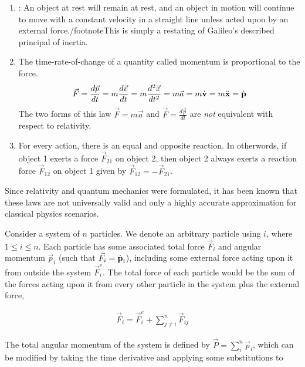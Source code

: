 \begin{fancybox}{1}
	\begin{enumerate}
		\item {}: An object at rest will remain at rest, and an object in motion will continue to move with a constant velocity in a straight line unless acted upon by an external force./footnote{This is simply a restating of Galileo's described principal of inertia.}
		\item The time-rate-of-change of a quantity called momentum is proportional to the force.
		\begin{align}
			\vec{F}=\frac{d\vec{p}}{dt} = m\frac{d\vec{v}}{dt} = m\frac{d^2\vec{x}}{dt^2} = m\vec{a} = m\dot{\text{\textbf{v}}} = m\ddot{\text{\textbf{x}}} = \dot{\text{\textbf{p}}} \label{Newton's Second Law}
		\end{align}
		The two forms of this law $\vec{F}=m\vec{a}$ and $\vec{F}=\frac{d\vec{p}}{dt}$ are \textit{not} equivalent with respect to relativity.
		\item For every action, there is an equal and opposite reaction. In otherwords, if object 1 exerts a force $\vec{F}_{21}$ on object 2, then object 2 always exerts a reaction force $\vec{F}_{12}$ on object 1 given by $\vec{F}_{12}=-\vec{F}_{21}$.
	\end{enumerate}
\end{fancybox}

\begin{interestnote}
Since relativity and quantum mechanics were formulated, it has been known that these laws are not universally valid and only a highly accurate approximation for classical physics scenarios.
\end{interestnote}

Consider a system of $n$ particles. We denote an arbitrary particle using $i$, where $1\leq i \leq n$. Each particle has some associated total force $\vec{F}_i$ and angular momentum $\vec{p}_i$ (such that $\vec{F}_i = \dot{\text{\textbf{p}}}_i$), including some external force acting upon it from outside the system $\vec{F}_i^e$. The total force of each particle would be the sum of the forces acting upon it from every other particle in the system plus the external force,

\begin{align}
\vec{F}_i = \vec{F}_i^e + \sum_{j\neq i}^{n} \vec{F}_{ij}
\end{align}

The total angular momentum of the system is defined by $\vec{P} = \sum_{i}^{n} \vec{p}_i$, which can be modified by taking the time derivative and applying some substitutions to

